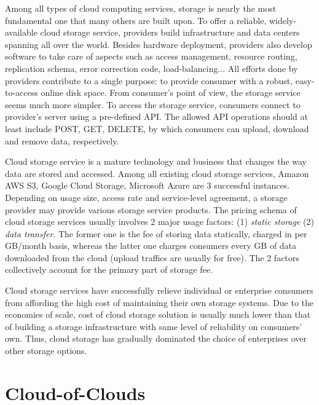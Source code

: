 Among all types of cloud computing services, storage is nearly the most fundamental one that many others are built upon. To offer a reliable, widely-available cloud storage service, providers build infrastructure and data centers spanning all over the world. Besides hardware deployment, providers also develop software to take care of aspects such as access management, resource routing, replication schema, error correction code, load-balancing... All efforts done by providers contribute to a single purpose: to provide consumer with a robust, easy-to-access online disk space. From consumer's point of view, the storage service seems much more simpler. To access the storage service, consumers connect to provider's server using a pre-defined API. The allowed API operations should at least include POST, GET, DELETE, by which consumers can upload, download and remove data, respectively.

Cloud storage service is a mature technology and business that changes the way data are stored and accessed. Among all existing cloud storage services, Amazon AWS S3\cite{awss3}, Google Cloud Storage\cite{googlecloudstorage}, Microsoft Azure\cite{msazurestorage} are 3 successful instances. Depending on usage size, access rate and service-level agreement, a storage provider may provide various storage service products. The pricing schema of cloud storage services usually involves 2 major usage factors: (1) \textit{static storage} (2) \textit{data transfer}. The former one is the fee of storing data statically, charged in per GB/month basis, whereas the latter one charges consumers every GB of data downloaded from the cloud (upload traffics are usually for free). The 2 factors collectively account for the primary part of storage fee.

Cloud storage services have successfully relieve individual or enterprise consumers from affording the high cost of maintaining their own storage systems. Due to the economies of scale, cost of cloud storage solution is usually much lower than that of building a storage infrastructure with same level of reliability on consumers' own. Thus, cloud storage has gradually dominated the choice of enterprises over other storage options\cite{storagetrends2018}.

\section{Cloud-of-Clouds}
\label{s:cloudofclouds}


